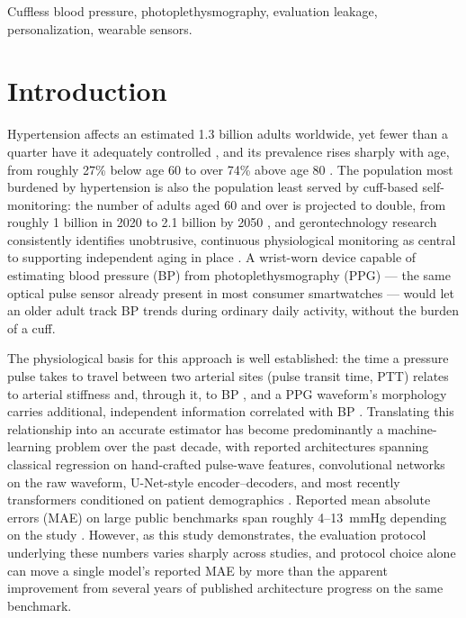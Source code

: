 \documentclass[journal]{IEEEtran}
\begin{document}
\begin{IEEEkeywords}
Cuffless blood pressure, photoplethysmography, evaluation leakage, personalization, wearable sensors.
\end{IEEEkeywords}

\section{Introduction}

Hypertension affects an estimated 1.3 billion adults worldwide, yet fewer than a quarter have it adequately controlled \cite{who2023}, and its prevalence rises sharply with age, from roughly 27\% below age 60 to over 74\% above age 80 \cite{oliveros2020}. The population most burdened by hypertension is also the population least served by cuff-based self-monitoring: the number of adults aged 60 and over is projected to double, from roughly 1 billion in 2020 to 2.1 billion by 2050 \cite{who2025}, and gerontechnology research consistently identifies unobtrusive, continuous physiological monitoring as central to supporting independent aging in place \cite{olmedo2022}. A wrist-worn device capable of estimating blood pressure (BP) from photoplethysmography (PPG) --- the same optical pulse sensor already present in most consumer smartwatches --- would let an older adult track BP trends during ordinary daily activity, without the burden of a cuff.

The physiological basis for this approach is well established: the time a pressure pulse takes to travel between two arterial sites (pulse transit time, PTT) relates to arterial stiffness and, through it, to BP \cite{mukkamala2015}, and a PPG waveform's morphology carries additional, independent information correlated with BP \cite{elgendi2019}. Translating this relationship into an accurate estimator has become predominantly a machine-learning problem over the past decade, with reported architectures spanning classical regression on hand-crafted pulse-wave features, convolutional networks on the raw waveform, U-Net-style encoder--decoders, and most recently transformers conditioned on patient demographics \cite{arjomand2024,chen2024,huang2024,shen2026}. Reported mean absolute errors (MAE) on large public benchmarks span roughly 4--13~mmHg depending on the study \cite{huang2024,moulaeifard2025,shen2026}. However, as this study demonstrates, the evaluation protocol underlying these numbers varies sharply across studies, and protocol choice alone can move a single model's reported MAE by more than the apparent improvement from several years of published architecture progress on the same benchmark.
\end{document}
